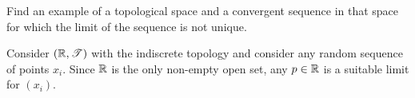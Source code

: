 \documentclass[letterpaper,12pt,fleqn]{article}
\newcommand{\T}{\mathscr{T}}
\begin{document}
\begin{example}
  Find an example of a topological space and a convergent sequence in that space for which the limit of the
  sequence is not unique.

  Consider \((\R,\T)\) with the indiscrete topology and consider any random sequence of points \(x_i\).  Since
  \(\mathbb{R}\) is the only non-empty open set, any \(p\in\mathbb{R}\) is a suitable limit for \((x_i)\).
\end{example}
\end{document}
